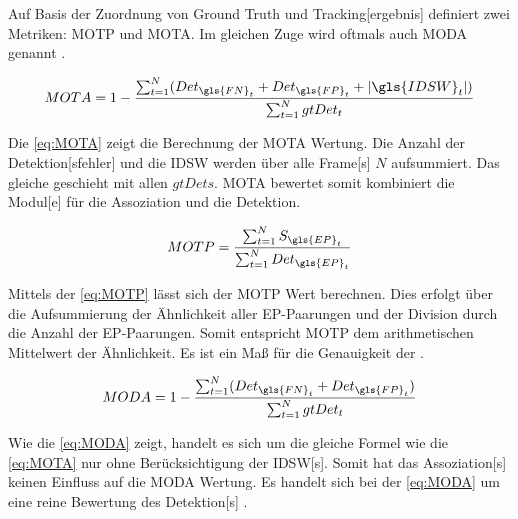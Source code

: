 Auf Basis der Zuordnung von \gls{Ground Truth} und \gls{Tracking}[ergebnis] definiert \cite{CLEAR.2008} zwei Metriken: \gls{MOTP} und \gls{MOTA}. Im gleichen Zuge wird oftmals auch \gls{MODA} genannt \cite{Kasturi.2009}. 

\begin{equation}
    \label{eq:MOTA}
    MOTA = 1-\frac{\sum_{t=1}^{N} (Det_{\gls{FN}_{t}}+Det_{\gls{FP}_{t}}+|\gls{IDSW}_{t}|)}{\sum_{t=1}^{N}gtDet_t}
\end{equation}

Die \autoref{eq:MOTA} zeigt die Berechnung der \gls{MOTA} Wertung. Die Anzahl der \gls{Detektion}[sfehler] und die \gls{IDSW} werden über alle \gls{Frame}[s] \(N\) aufsummiert. Das gleiche geschieht mit allen \(gtDets\). \gls{MOTA} bewertet somit kombiniert die \gls{Modul}[e] für die \gls{Assoziation} und die \gls{Detektion}. 

\begin{equation}
    \label{eq:MOTP}
    MOTP = \frac{\sum_{t=1}^{N}S_{\gls{EP}_t}}{\sum_{t=1}^{N}Det_{\gls{EP}_t}}
\end{equation}

Mittels der \autoref{eq:MOTP} lässt sich der \gls{MOTP} Wert berechnen. Dies erfolgt über die Aufsummierung der Ähnlichkeit aller \gls{EP}-Paarungen und der Division durch die Anzahl der \gls{EP}-Paarungen. Somit entspricht \gls{MOTP} dem arithmetischen Mittelwert der Ähnlichkeit. Es ist ein Maß für die Genauigkeit der .

\begin{equation}
    \label{eq:MODA}
    MODA =  1-\frac{\sum_{t=1}^{N} (Det_{\gls{FN}_{t}}+Det_{\gls{FP}_{t}})}{\sum_{t=1}^{N}gtDet_t}
\end{equation}

Wie die \autoref{eq:MODA} zeigt, handelt es sich um die gleiche Formel wie die \autoref{eq:MOTA} nur ohne Berücksichtigung der \gls{IDSW}[s]. Somit hat das \gls{Assoziation}[s] keinen Einfluss auf die MODA Wertung. Es handelt sich bei der \autoref{eq:MODA} um eine reine Bewertung des \gls{Detektion}[s] \cite{CLEAR.2008, HOTA, Kasturi.2009}.


